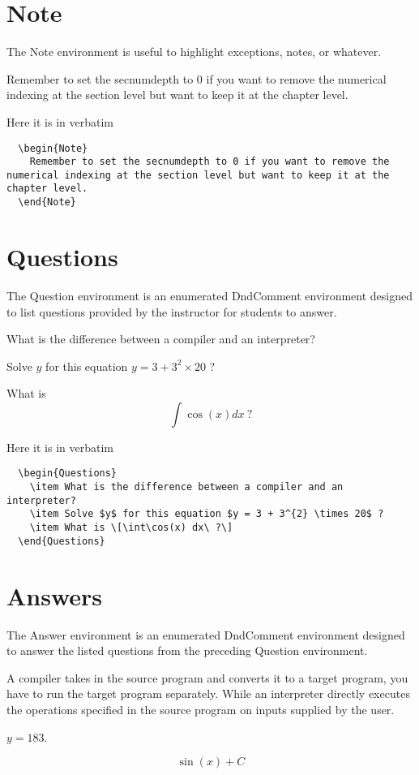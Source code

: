 \documentclass[letterpaper,10pt,twoside,onecolumn,openany,draft]{book}
\begin{document}
\section{Note}
The Note environment is useful to highlight exceptions, notes, or whatever.
\begin{Note}
  Remember to set the secnumdepth to 0 if you want to remove the numerical indexing at the section level but want to keep it at the chapter level.
\end{Note}

Here it is in verbatim
\begin{verbatim}
  \begin{Note}
    Remember to set the secnumdepth to 0 if you want to remove the numerical indexing at the section level but want to keep it at the chapter level.
  \end{Note} 
\end{verbatim}

\section{Questions}
The Question environment is an enumerated DndComment environment designed to list questions provided by the instructor for students to answer.
\begin{Questions}
\item What is the difference between a compiler and an interpreter?
\item Solve $y$ for this equation $y = 3 + 3^{2} \times 20$ ? 
\item What is \[\int\cos(x) dx\ ?\] 
\end{Questions}

Here it is in verbatim
\begin{verbatim}
  \begin{Questions}
    \item What is the difference between a compiler and an interpreter?
    \item Solve $y$ for this equation $y = 3 + 3^{2} \times 20$ ? 
    \item What is \[\int\cos(x) dx\ ?\] 
  \end{Questions}
\end{verbatim}

\section{Answers}
The Answer environment is an enumerated DndComment environment designed to answer the listed questions from the preceding Question environment. 
\begin{Answers}
\item A compiler takes in the source program and converts it to a target program, you have to run the target program separately. While an interpreter directly executes the operations specified in the source program on inputs supplied by the user. 
\item $y = 183$. 
\item \[\sin{\left(x \right)} + C \]
\end{Answers}
\end{document}
